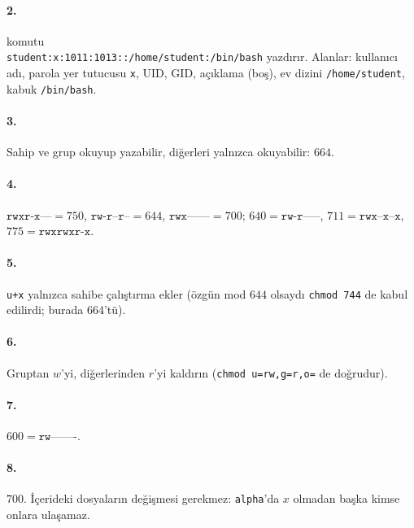 \paragraph{2.}  komutu\\ \texttt{student:x:1011:1013::/home/student:/bin/bash} yazdırır. Alanlar: kullanıcı adı, parola yer tutucusu \texttt{x}, UID, GID, açıklama (boş), ev dizini \texttt{/home/student}, kabuk \texttt{/bin/bash}.

\paragraph{3.} Sahip ve grup okuyup yazabilir, diğerleri yalnızca okuyabilir: $664$.


\paragraph{4.} $\texttt{rwxr-x---} = 750$, $\texttt{rw-r--r--} = 644$, $\texttt{rwx------} = 700$; $640 = \texttt{rw-r-----}$, $711 = \texttt{rwx--x--x}$, $775 = \texttt{rwxrwxr-x}$.

\paragraph{5.} \texttt{u+x} yalnızca sahibe çalıştırma ekler (özgün mod $644$ olsaydı \texttt{chmod 744} de kabul edilirdi; burada $664$'tü).


\paragraph{6.} Gruptan $w$'yi, diğerlerinden $r$'yi kaldırın (\texttt{chmod u=rw,g=r,o=} de doğrudur).


\paragraph{7.} $600 = \texttt{rw-------}$.


\paragraph{8.} $700$. İçerideki dosyaların değişmesi gerekmez: \texttt{alpha}'da $x$ olmadan başka kimse onlara ulaşamaz.


